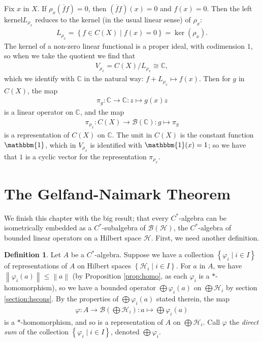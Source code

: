 \documentclass[11pt,a4paper]{report}
\theoremstyle{plain}
\theoremstyle{definition}
\newtheorem{defn}{Definition}
\newcommand{\1}{\mathbbm{1}}
\newcommand{\C}{\mathbb{C}}
\renewcommand{\H}{\mathcal{H}}
\newcommand{\B}{\mathcal{B}}
\newcommand{\BH}{\mathcal{\B(\H)}}
\renewcommand{\phi}{\varphi}
\newcommand{\CX}{C(X)}
\renewcommand{\bar}{\overline}
\renewcommand{\oplus}{\textstyle\bigoplus}
\begin{document}
Fix $x$ in $X$. If $\rho_x(\bar f f)=0$, then $(\bar f f)(x)=0$ and $f(x)=0$. 
Then the left kernel$L_{\rho_x}$ reduces to the kernel (in the usual linear 
sense) of $\rho_x$:
\begin{align*}
	L_{\rho_x} = \left\{f\in\CX \mid f(x) = 0\right\} = \ker(\rho_x).
\end{align*}
The kernel of a non-zero linear functional is a proper ideal, with codimension 
$1$, so when we take the quotient we find that 
\begin{align*}
	V_{\rho_x} = \CX/L_{\rho_x} \cong \C,
\end{align*}
which we identify with $\C$ in the natural way: $f+L_{\rho_x} \mapsto f(x)$.
Then for $g$ in $\CX$, the map 
\begin{align*}
	\pi_g:\C\to\C:z\mapsto g(x)z
\end{align*} 
is a linear operator on $\C$, and the map 
\begin{align*}
	\pi_{\rho_x}:\CX\to\B(\C):g\mapsto\pi_g
\end{align*} 
is a representation of $\CX$ on $\C$. The unit in $\CX$ is the constant function 
$\1$, which in $V_{\rho_x}$ is identified with $\1(x)=1$; so we have that $1$ is 
a cyclic vector for the representation $\pi_{\rho_x}$.
\todo[inline]{do this to a nonpure state on $\CX$}

\section{The Gelfand-Naimark Theorem}\label{section:gn}
We finish this chapter with the big result; that every $C^\ast$-algebra can be 
isometrically embedded as a $C^\ast$-subalgebra of $\BH$, the $C^\ast$-algebra 
of bounded linear operators on a Hilbert space $\H$. First, we need another 
definition.

\begin{defn}
	Let $A$ be a $C^\ast$-algebra. Suppose we have a collection $\left\{\phi_i \mid 
	i\in I\right\}$ of representations of $A$ on Hilbert spaces $\left\{\H_i \mid 
	i\in I\right\}$. For $a$ in $A$, we have $\left\|\phi_i(a)\right\| \leq 
	\left\|a\right\|$ (by Proposition \ref{prop:homo}, as each $\phi_i$ is a 
	$\ast$-homomorphism), so we have a bounded operator $\oplus\phi_i(a)$ on $\oplus 
	\H_i$ by section \ref{section:hscons}. By the properties of $\oplus\phi_i(a)$ 
	stated therein, the map
	\begin{align*}
		\phi:A\to \B(\oplus\H_i):a\mapsto\oplus\phi_i(a)
	\end{align*}
	is a $\ast$-homomorphism, and so is a representation of $A$ on $\oplus\H_i$. 
	Call $\phi$ the \emph{direct sum} of the collection $\left\{\phi_i \mid i\in 
	I\right\}$, denoted $\oplus\phi_i$.

\end{defn}
\end{document}
